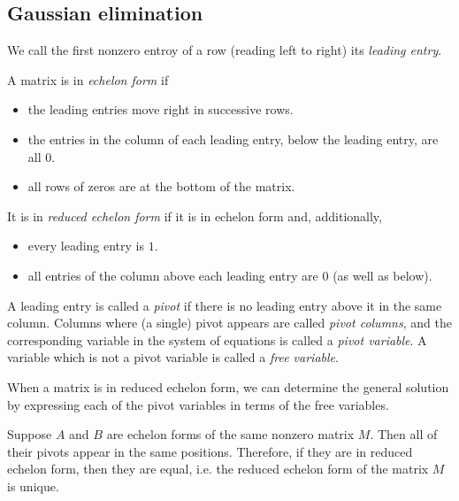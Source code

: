 \documentclass[12pt]{article}
\begin{document}
\subsection{Gaussian elimination} %

\begin{definition}
	We call the first nonzero entroy of a row (reading left to right) its \emph{leading entry}.
\end{definition}

\begin{definition}
	A matrix is in \emph{echelon form} if
	\begin{itemize}
		\item the leading entries move right in successive rows.
		\item the entries in the column of each leading entry, below the leading entry, are all $0$.
		\item all rows of zeros are at the bottom of the matrix.
	\end{itemize}
	It is in \emph{reduced echelon form} if it is in echelon form and, additionally, 
	\begin{itemize}
		\item every leading entry is $1$.
		\item all entries of the column above each leading entry are 0 (as well as below).
	\end{itemize}
\end{definition}

\begin{definition}
	A leading entry is called a \emph{pivot} if there is no leading entry above it in the same column. Columns where (a single) pivot appears are called \emph{pivot columns}, and the corresponding variable in the system of equations is called a \emph{pivot variable}. A variable which is not a pivot variable is called a \emph{free variable}.
\end{definition}

\begin{remark}
	When a matrix is in reduced echelon form, we can determine the general solution by expressing each of the pivot variables in terms of the free variables.
\end{remark}

\begin{theorem}
	Suppose $A$ and $B$ are echelon forms of the same nonzero matrix $M$. Then all of their pivots appear in the same positions. Therefore, if they are in reduced echelon form, then they are equal, i.e. the reduced echelon form of the matrix $M$ is unique.
\end{theorem}
\end{document}
